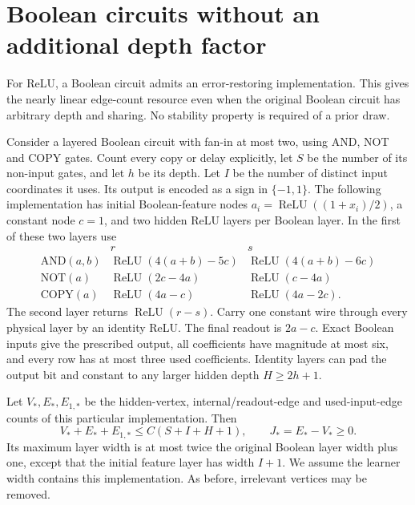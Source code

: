 \section{Boolean circuits without an additional depth factor}
\label{sec:digital-circuits}
For ReLU, a Boolean circuit admits an error-restoring implementation. This gives the nearly linear edge-count resource even when the original Boolean circuit has arbitrary depth and sharing. No stability property is required of a prior draw.

Consider a layered Boolean circuit with fan-in at most two, using AND, NOT and COPY gates. Count every copy or delay explicitly, let $S$ be the number of its non-input gates, and let $h$ be its depth. Let $I$ be the number of distinct input coordinates it uses. Its output is encoded as a sign in $\{-1,1\}$. The following implementation has initial Boolean-feature nodes $a_i=\operatorname{ReLU}((1+x_i)/2)$, a constant node $c=1$, and two hidden ReLU layers per Boolean layer. In the first of these two layers use
\[
 \begin{array}{c|c|c}
 &r&s\\ \hline
 \mathrm{AND}(a,b)&\operatorname{ReLU}(4(a+b)-5c)&
                     \operatorname{ReLU}(4(a+b)-6c)\\
 \mathrm{NOT}(a)&\operatorname{ReLU}(2c-4a)&
                     \operatorname{ReLU}(c-4a)\\
 \mathrm{COPY}(a)&\operatorname{ReLU}(4a-c)&
                     \operatorname{ReLU}(4a-2c).
 \end{array}
\]
The second layer returns $\operatorname{ReLU}(r-s)$. Carry one constant wire through every physical layer by an identity ReLU. The final readout is $2a-c$. Exact Boolean inputs give the prescribed output, all coefficients have magnitude at most six, and every row has at most three used coefficients. Identity layers can pad the output bit and constant to any larger hidden depth $H\ge2h+1$.

Let $V_*,E_*,E_{1,*}$ be the hidden-vertex, internal/readout-edge and used-input-edge counts of this particular implementation. Then
\[
 V_*+E_*+E_{1,*}\le C(S+I+H+1),\qquad
 J_*=E_*-V_*\ge0.
\]
Its maximum layer width is at most twice the original Boolean layer width plus one, except that the initial feature layer has width $I+1$. We assume the learner width contains this implementation. As before, irrelevant vertices may be removed.

